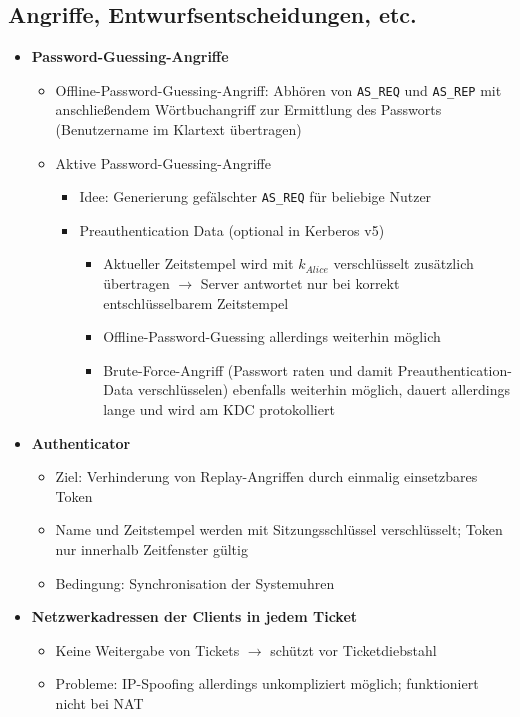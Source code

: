\subsection{Angriffe, Entwurfsentscheidungen, etc.}
\begin{itemize}
	\item \textbf{Password-Guessing-Angriffe}
	\begin{itemize}
		\item Offline-Password-Guessing-Angriff: Abhören von \texttt{AS\_REQ} und \texttt{AS\_REP} mit anschließendem Wörtbuchangriff zur Ermittlung des Passworts (Benutzername im Klartext übertragen)
		\item Aktive Password-Guessing-Angriffe
		\begin{itemize}
			\item Idee: Generierung gefälschter \texttt{AS\_REQ} für beliebige Nutzer
			\item Preauthentication Data (optional in Kerberos v5)
			\begin{itemize}
				\item Aktueller Zeitstempel wird mit \(k_{Alice}\) verschlüsselt zusätzlich übertragen \(\rightarrow\) Server antwortet nur bei korrekt entschlüsselbarem Zeitstempel
				\item Offline-Password-Guessing allerdings weiterhin möglich
				\item Brute-Force-Angriff (Passwort raten und damit Preauthentication-Data verschlüsselen) ebenfalls weiterhin möglich, dauert allerdings lange und wird am KDC protokolliert
			\end{itemize}
		\end{itemize}
	\end{itemize}
	\item \textbf{Authenticator}
	\begin{itemize}
		\item Ziel: Verhinderung von Replay-Angriffen durch einmalig einsetzbares Token
		\item Name und Zeitstempel werden mit Sitzungsschlüssel verschlüsselt; Token nur innerhalb Zeitfenster gültig
		\item Bedingung: Synchronisation der Systemuhren
	\end{itemize}
	\item \textbf{Netzwerkadressen der Clients in jedem Ticket}
	\begin{itemize}
		\item Keine Weitergabe von Tickets \(\rightarrow\) schützt vor Ticketdiebstahl
		\item Probleme: IP-Spoofing allerdings unkompliziert möglich; funktioniert nicht bei NAT

\end{itemize}
\end{itemize}

